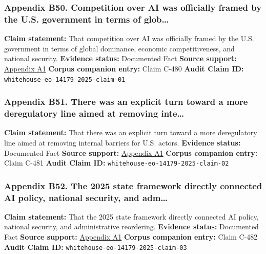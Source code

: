 \documentclass[
  american,
  11pt,
  letterpaper,
]{article}
\begin{document}
\subsubsection{Appendix B50. Competition over AI was officially framed
by the U.S. government in terms of
glob\ldots{}}\label{ch-07-appendix-b50-competition-over-ai-was-officially-framed-by-the-u-s-government-in-terms-of-glob}

\textbf{Claim statement:} That competition over AI was officially framed
by the U.S. government in terms of global dominance, economic
competitiveness, and national security. \textbf{Evidence status:}
Documented Fact \textbf{Source support:}
\hyperref[ch-07-appendix-a1-removing-barriers-to-american-leadership-in-artificial-intelligence]{Appendix
A1} \textbf{Corpus companion entry:} Claim C-480 \textbf{Audit Claim
ID:} \texttt{whitehouse-eo-14179-2025-claim-01}

\subsubsection{Appendix B51. There was an explicit turn toward a more
deregulatory line aimed at removing
inte\ldots{}}\label{ch-07-appendix-b51-there-was-an-explicit-turn-toward-a-more-deregulatory-line-aimed-at-removing-inte}

\textbf{Claim statement:} That there was an explicit turn toward a more
deregulatory line aimed at removing internal barriers for U.S. actors.
\textbf{Evidence status:} Documented Fact \textbf{Source support:}
\hyperref[ch-07-appendix-a1-removing-barriers-to-american-leadership-in-artificial-intelligence]{Appendix
A1} \textbf{Corpus companion entry:} Claim C-481 \textbf{Audit Claim
ID:} \texttt{whitehouse-eo-14179-2025-claim-02}

\subsubsection{Appendix B52. The 2025 state framework directly connected
AI policy, national security, and
adm\ldots{}}\label{ch-07-appendix-b52-the-2025-state-framework-directly-connected-ai-policy-national-security-and-adm}

\textbf{Claim statement:} That the 2025 state framework directly
connected AI policy, national security, and administrative reordering.
\textbf{Evidence status:} Documented Fact \textbf{Source support:}
\hyperref[ch-07-appendix-a1-removing-barriers-to-american-leadership-in-artificial-intelligence]{Appendix
A1} \textbf{Corpus companion entry:} Claim C-482 \textbf{Audit Claim
ID:} \texttt{whitehouse-eo-14179-2025-claim-03}
\end{document}
